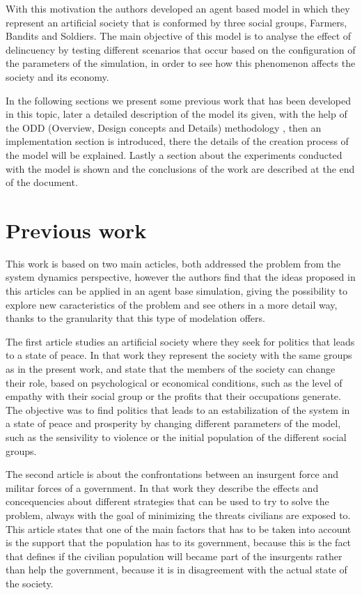 \documentclass{wscpaperproc}
\begin{document}
With this motivation the authors developed an agent based model in which they
represent an artificial society that is conformed by three social groups,
Farmers, Bandits and Soldiers. The main objective of this model is to
analyse the effect of delincuency by testing different scenarios that
occur based on the configuration of the parameters of the simulation,
in order to see how this phenomenon affects the society and its
economy.

In the following sections we present some previous work that has been developed
in this topic, later a detailed description of the model its given, with the
help of the ODD (Overview, Design concepts and Details) methodology
\cite{modbook}, then an implementation section is introduced, there the details
of the creation process of the model will be explained. Lastly a section about
the experiments conducted with the model is shown and the conclusions of the
work are described at the end of the document.

\section{Previous work}

This work is based on two main acticles, both addressed the problem from the
system dynamics perspective, however the authors find that the ideas proposed in
this articles can be applied in an agent base simulation, giving the possibility
to explore new caracteristics of the problem and see others in a more
detail way, thanks to the granularity that this type of modelation offers.

The first article studies an artificial society where they seek for politics
that leads to a state of peace. In that work they represent the society with
the same groups as in the present work, and state that the members of the
society can change their role, based on psychological or economical conditions,
such as the level of empathy with their social group or the profits
that their occupations generate. The objective was to find politics
that leads to an estabilization of the system in a state of peace and
prosperity by changing different parameters of the model, such as the
sensivility to violence or the initial population of the different social
groups. \cite{article1}

The second article is about the confrontations between an insurgent force and
militar forces of a government. In that work they describe the effects and
concequencies about different strategies that can be used to try to solve the
problem, always with the goal of minimizing the threats civilians are exposed to.
This article states that one of the main factors that has to be taken
into account is the support that the population has to its government, because
this is the fact that defines if the civilian population will became part of the
insurgents rather than help the government, because it is in disagreement with
the actual state of the society. \cite{article2}
\end{document}
